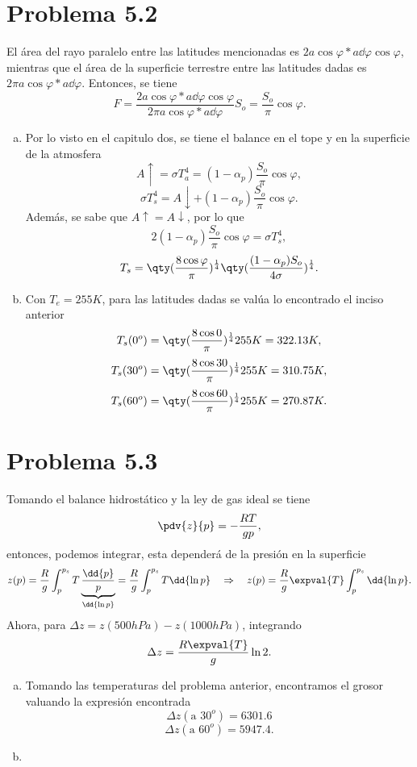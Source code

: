 \vspace{0.5cm}


\section*{Problema 5.2}
El área del rayo paralelo entre las latitudes mencionadas es $2a\cos{\varphi} *a\dd{\varphi} \cos{\varphi}$, mientras que el área de la superficie terrestre entre las latitudes dadas es $2\pi a\cos{\varphi} *a\dd{\varphi}$. Entonces, se tiene
	$$ F = \frac{2a\cos{\varphi} *a\dd{\varphi} \cos{\varphi}}{2\pi a\cos{\varphi} *a\dd{\varphi}} S_o = \frac{S_o}{\pi} \cos{\varphi}. $$
	\begin{enumerate}[a)]
		\item Por lo visto en el capitulo dos, se tiene el balance en el tope y en la superficie de la atmosfera
			$$ A\uparrow = \sigma T_a ^4 = (1 - \alpha _p) \frac{S_o}{\pi} \cos{\varphi}, $$
			$$ \sigma T_s ^4 = A\downarrow + (1 - \alpha _p) \frac{S_o}{\pi} \cos{\varphi}. $$
		Además, se sabe que $A\uparrow = A\downarrow$, por lo que
			$$ 2(1 - \alpha _p) \frac{S_o}{\pi} \cos{\varphi} = \sigma T_s ^4, $$
			$$ T_s = \qty(\frac{8\cos{\varphi}}{\pi})^{\frac{1}{4}} \qty(\frac{(1 - \alpha _p) S_o}{4\sigma})^{\frac{1}{4}}. $$
		\item Con $T_e = 255K$, para las latitudes dadas se valúa lo encontrado el inciso anterior
			$$ T_s (0^o) = \qty(\frac{8\cos{0}}{\pi})^{\frac{1}{4}} 255K = 322.13K, $$
			$$ T_s (30^o) = \qty(\frac{8\cos{30}}{\pi})^{\frac{1}{4}} 255K = 310.75K, $$
			$$ T_s (60^o) = \qty(\frac{8\cos{60}}{\pi})^{\frac{1}{4}} 255K = 270.87K. $$
	\end{enumerate}
	
\section*{Problema 5.3}
Tomando el balance hidrostático y la ley de gas ideal se tiene
	$$ \pdv{z}{p} = - \frac{RT}{gp}, $$
entonces, podemos integrar, esta dependerá de la presión en la superficie
	$$ z(p) = \frac{R}{g} \int _p ^{p_s} T \underbrace{\frac{\dd{p}}{p}}_{\dd{\ln{p}}} = \frac{R}{g} \int _p ^{p_s} T \dd{\ln{p}} \quad \Rightarrow \quad z(p) = \frac{R}{g} \expval{T} \int _p ^{p_s} \dd{\ln{p}}. $$
Ahora, para $\Delta z = z(500hPa) - z(1000hPa)$, integrando
	$$ \Delta z = \frac{R \expval{T}}{g} \ln{2}. $$
	
	
\begin{enumerate}[a)]
	\item Tomando las temperaturas del problema anterior, encontramos el grosor valuando la expresión encontrada
		$$ \Delta z (\text{a } 30^o) = 6301.6 $$
		$$ \Delta z (\text{a } 60^o) = 5947.4. $$
	\item 
\end{enumerate}



